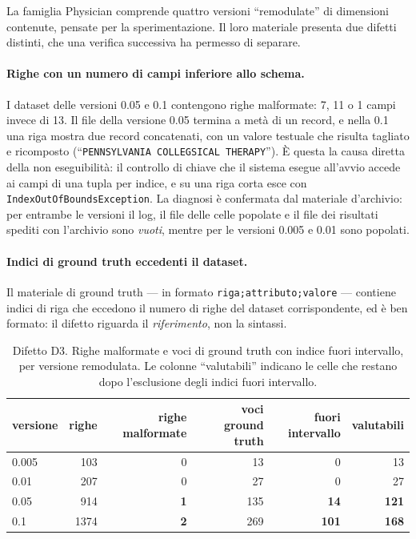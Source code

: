 La famiglia Physician comprende quattro versioni ``remodulate'' di dimensioni contenute, pensate
per la sperimentazione. Il loro materiale presenta due difetti distinti, che una verifica
successiva ha permesso di separare.

\paragraph{Righe con un numero di campi inferiore allo schema.} I dataset delle versioni 0.05 e
0.1 contengono righe malformate: \num{7}, \num{11} o \num{1} campi invece di \num{13}. Il file
della versione 0.05 termina a metà di un record, e nella 0.1 una riga mostra due record
concatenati, con un valore testuale che risulta tagliato e ricomposto (``\texttt{PENNSYLVANIA
COLLEGSICAL THERAPY}''). È questa la causa diretta della non eseguibilità: il controllo di chiave
che il sistema esegue all'avvio accede ai campi di una tupla per indice, e su una riga corta esce
con \texttt{IndexOutOfBoundsException}. La diagnosi è confermata dal materiale d'archivio: per
entrambe le versioni il log, il file delle celle popolate e il file dei risultati spediti con
l'archivio sono \emph{vuoti}, mentre per le versioni 0.005 e 0.01 sono popolati.

\paragraph{Indici di ground truth eccedenti il dataset.} Il materiale di ground truth --- in
formato \texttt{riga;attributo;valore} --- contiene indici di riga che eccedono il numero di righe
del dataset corrispondente, ed è ben formato: il difetto riguarda il \emph{riferimento}, non la
sintassi.

\begin{table}[htbp]
\centering
\caption{Difetto D3. Righe malformate e voci di ground truth con indice fuori intervallo, per
versione remodulata. Le colonne ``valutabili'' indicano le celle che restano dopo l'esclusione
degli indici fuori intervallo.}
\label{tab:physician-gt}
\footnotesize
\begin{tabular}{lrrrrr}
\toprule
versione & righe & righe malformate & voci ground truth & fuori intervallo & valutabili \\
\midrule
0.005 & 103  & 0 & 13  & 0   & 13 \\
0.01  & 207  & 0 & 27  & 0   & 27 \\
0.05  & 914  & \textbf{1} & 135 & \textbf{14}  & \textbf{121} \\
0.1   & 1374 & \textbf{2} & 269 & \textbf{101} & \textbf{168} \\
\bottomrule
\end{tabular}
\end{table}

